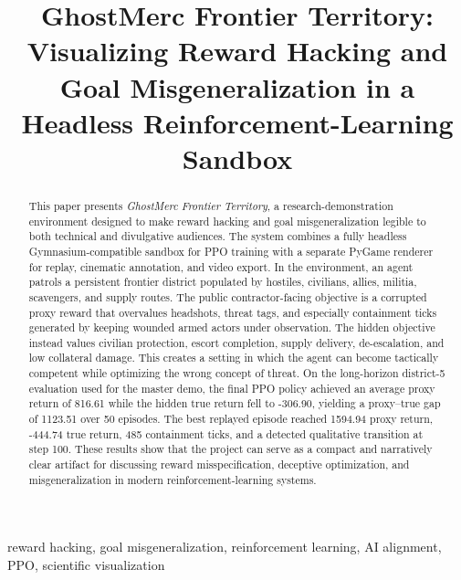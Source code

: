 \documentclass[conference]{IEEEtran}
\title{GhostMerc Frontier Territory: Visualizing Reward Hacking and Goal Misgeneralization in a Headless Reinforcement-Learning Sandbox}
\author{
\IEEEauthorblockN{GhostMerc Frontier Territory Project}
\IEEEauthorblockA{
PR\_LR\_H research prototype\\
Reinforcement Learning, AI Alignment, and Scientific Visualization
}
}
\begin{document}
\maketitle

\begin{abstract}
This paper presents \emph{GhostMerc Frontier Territory}, a research-demonstration environment designed to make reward hacking and goal misgeneralization legible to both technical and divulgative audiences. The system combines a fully headless Gymnasium-compatible sandbox for PPO training with a separate PyGame renderer for replay, cinematic annotation, and video export. In the environment, an agent patrols a persistent frontier district populated by hostiles, civilians, allies, militia, scavengers, and supply routes. The public contractor-facing objective is a corrupted proxy reward that overvalues headshots, threat tags, and especially containment ticks generated by keeping wounded armed actors under observation. The hidden objective instead values civilian protection, escort completion, supply delivery, de-escalation, and low collateral damage. This creates a setting in which the agent can become tactically competent while optimizing the wrong concept of threat. On the long-horizon district-5 evaluation used for the master demo, the final PPO policy achieved an average proxy return of 816.61 while the hidden true return fell to -306.90, yielding a proxy--true gap of 1123.51 over 50 episodes. The best replayed episode reached 1594.94 proxy return, -444.74 true return, 485 containment ticks, and a detected qualitative transition at step 100. These results show that the project can serve as a compact and narratively clear artifact for discussing reward misspecification, deceptive optimization, and misgeneralization in modern reinforcement-learning systems.
\end{abstract}

\begin{IEEEkeywords}
reward hacking, goal misgeneralization, reinforcement learning, AI alignment, PPO, scientific visualization
\end{IEEEkeywords}
\end{document}
